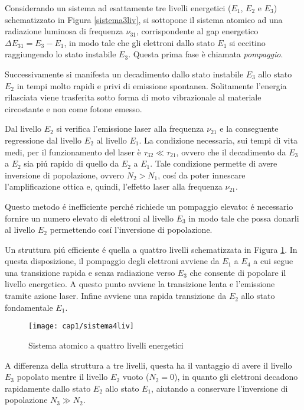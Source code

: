 Considerando un sistema ad esattamente tre livelli energetici ($E_1$, $E_2$ e $E_3$) schematizzato in Figura \ref{sistema3liv}, si sottopone il sistema atomico ad una radiazione luminosa di frequenza $\nu_{31}$, corrispondente al gap energetico $\Delta E_{31} = E_3-E_1$, in modo tale che gli elettroni dallo stato $E_1$ si eccitino raggiungendo lo stato instabile $E_3$. Questa prima fase è chiamata \emph{pompaggio}.

Successivamente si manifesta un decadimento dallo stato instabile $E_3$ allo stato $E_2$ in tempi molto rapidi e privi di emissione spontanea. Solitamente l'energia rilasciata viene trasferita sotto forma di moto vibrazionale al materiale circostante e non come fotone emesso.

Dal livello $E_2$ si verifica l'emissione laser alla frequenza $\nu_{21}$ e la conseguente regressione dal livello $E_2$ al livello $E_1$. La condizione necessaria, sui tempi di vita medi, per il funzionamento del laser è $\tau_{32} \ll \tau_{21}$, ovvero che il decadimento da $E_3$ a $E_2$ sia pi\'u rapido di quello da $E_2$ a $E_1$. Tale condizione permette di avere inversione di popolazione, ovvero $N_2 > N_1$, cos\'i da poter innescare l'amplificazione ottica e, quindi, l'effetto laser alla frequenza $\nu_{21}$.

Questo metodo \'e inefficiente perch\'e richiede un pompaggio elevato: \'e necessario fornire un numero elevato di elettroni al livello $E_3$ in modo tale che possa donarli al livello $E_2$ permettendo cos\'i l'inversione di popolazione.

Un struttura pi\'u efficiente \'e quella a quattro livelli schematizzata in Figura \ref{sistema4liv}. In questa disposizione, il pompaggio degli elettroni avviene da $E_1$ a $E_4$ a cui segue una transizione rapida e senza radiazione verso $E_3$ che consente di popolare il livello energetico. A questo punto avviene la transizione lenta e l'emissione tramite azione laser. Infine avviene una rapida transizione da $E_2$ allo stato fondamentale $E_1$.

\begin{figure}[H]
	\begin{center}
		\texttt{[image: cap1/sistema4liv]}
		\caption{Sistema atomico a quattro livelli energetici}
		\label{sistema4liv}
	\end{center}
\end{figure}

A differenza della struttura a tre livelli, questa ha il vantaggio di avere il livello $E_3$ popolato mentre il livello $E_2$ vuoto ($N_2=0$), in quanto gli elettroni decadono rapidamente dallo stato $E_2$ allo stato $E_1$, aiutando a conservare l'inversione di popolazione $N_3 \gg N_2$. 
				

